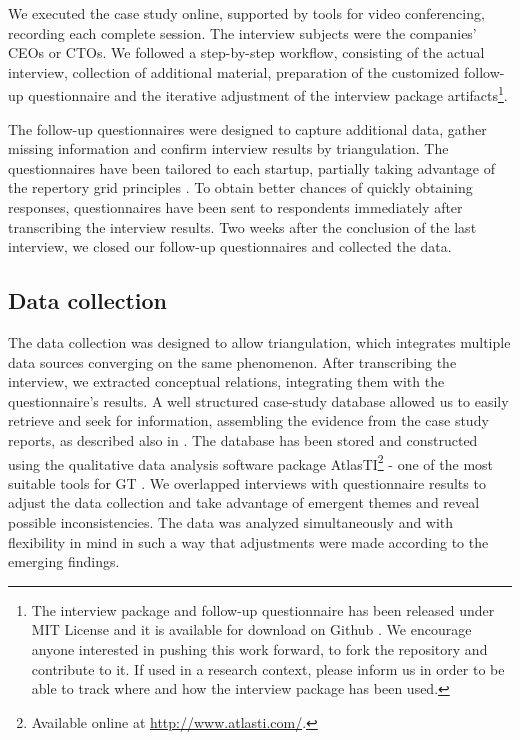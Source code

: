 \documentclass[10pt,journal,letterpaper,compsoc]{IEEEtran}
\begin{document}
We executed the case study online, supported by tools for video conferencing, 
recording each complete session. The interview subjects were the companies' CEOs 
or CTOs. We followed a step-by-step workflow, consisting of the actual 
interview, collection of additional material, preparation of the customized 
follow-up questionnaire and the iterative adjustment of the interview package 
artifacts\footnote{The interview package and follow-up questionnaire has been 
released under MIT License \cite{MITLicense} and it is available for download on 
Github \cite{GitHubInterviewPackage}. We encourage anyone interested in pushing 
this work forward, to fork the repository and contribute to it. If used in a 
research context, please inform us in order to be able to track where and how 
the interview package has been used.}.

The follow-up questionnaires were designed to capture additional data, gather 
missing information and confirm interview results by triangulation. The 
questionnaires have been tailored to each startup, partially taking advantage of 
the repertory grid principles \cite{Edwards2009}. To obtain better chances of 
quickly obtaining responses, questionnaires have been sent to respondents 
immediately after transcribing the interview results. Two weeks after the 
conclusion of the last interview, we closed our follow-up questionnaires and 
collected the data. %

\subsection{Data collection}
The data collection was designed to allow triangulation, which integrates 
multiple data sources converging on the same phenomenon. After transcribing the 
interview, we extracted conceptual relations, integrating them with the 
questionnaire's results. A well structured case-study database allowed us to 
easily retrieve and seek for information, assembling the evidence from the case 
study reports, as described also in \cite{Yin1994}. The database has been stored 
and constructed using the qualitative data analysis software package 
AtlasTI\footnote{Available online at \url{http://www.atlasti.com/}.} - one of 
the most suitable tools for GT \cite{Coleman2007}. 
We overlapped interviews with questionnaire results to adjust the data 
collection and take advantage of emergent themes and reveal possible 
inconsistencies. The data was analyzed simultaneously and with flexibility in 
mind in such a way that adjustments were made according to the emerging 
findings.
\end{document}
